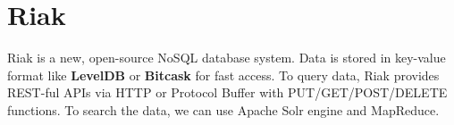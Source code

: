 \chapter{Riak}
\label{chap:Riak}

Riak is a new, open-source NoSQL database system. Data is stored in key-value
format like {\bf LevelDB} or {\bf Bitcask} for fast access. To query data, Riak
provides REST-ful APIs via HTTP or Protocol Buffer with PUT/GET/POST/DELETE
functions. To search the data, we can use Apache Solr engine and MapReduce.


